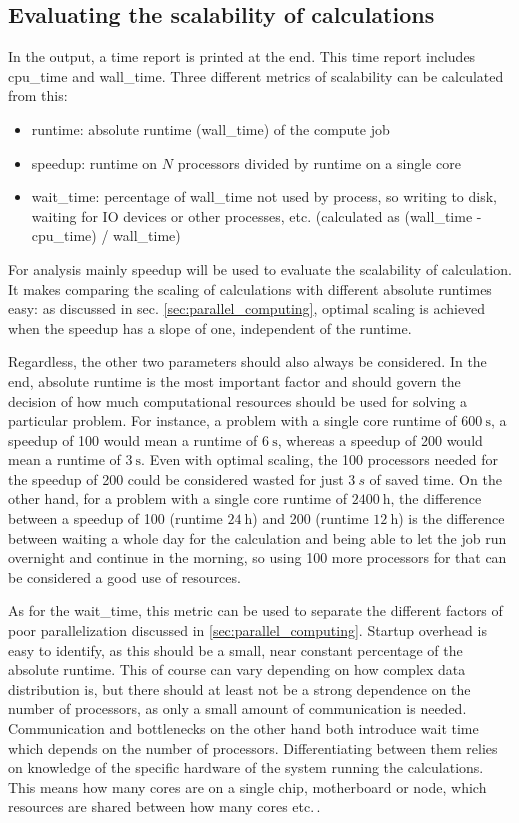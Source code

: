 \documentclass[main.tex]{subfiles}
\begin{document}
\subsection{Evaluating the scalability of \QE calculations}\label{sub:scalability_qe}

In the \QE output, a time report is printed at the end.
This time report includes \gls{cpu_time} and \gls{wall_time}.
Three different metrics of scalability can be calculated from this:
\begin{itemize}
    \item runtime: absolute runtime (\gls{wall_time}) of the compute job
    \item speedup: runtime on \(N\) processors divided by runtime on a single core
    \item \gls{wait_time}: percentage of \gls{wall_time} not used by \QE process, so writing to disk, waiting for IO devices or other processes, etc. (calculated as (\gls{wall_time} - \gls{cpu_time}) / \gls{wall_time})
\end{itemize}
For analysis mainly speedup will be used to evaluate the scalability of \QE calculation.
It makes comparing the scaling of calculations with different absolute runtimes easy: as discussed in sec. \ref{sec:parallel_computing}, optimal scaling is achieved when the speedup has a slope of one, independent of the runtime.

Regardless, the other two parameters should also always be considered.
In the end, absolute runtime is the most important factor and should govern the decision of how much computational resources should be used for solving a particular problem.
For instance, a problem with a single core runtime of \(\SI{600}{\s}\), a speedup of 100 would mean a runtime of \(\SI{6}{\s}\), whereas a speedup of 200 would mean a runtime of \(\SI{3}{\s}\).
Even with optimal scaling, the 100 processors needed for the speedup of 200 could be considered wasted for just \(\SI{3}{s}\) of saved time.
On the other hand, for a problem with a single core runtime of \(\SI{2400}{\hour}\), the difference between a speedup of 100 (runtime \(\SI{24}{\hour}\)) and 200 (runtime \(\SI{12}{\hour}\)) is the difference between waiting a whole day for the calculation and being able to let the job run overnight and continue in the morning, so using 100 more processors for that can be considered a good use of resources.

As for the \gls{wait_time}, this metric can be used to separate the different factors of poor parallelization discussed in \ref{sec:parallel_computing}.
Startup overhead is easy to identify, as this should be a small, near constant percentage of the absolute runtime.
This of course can vary depending on how complex data distribution is, but there should at least not be a strong dependence on the number of processors, as only a small amount of communication is needed.
Communication and bottlenecks on the other hand both introduce wait time which depends on the number of processors.
Differentiating between them relies on knowledge of the specific hardware of the system running the calculations.
This means how many cores are on a single chip, motherboard or node, which resources are shared between how many cores etc.\,.
\end{document}
